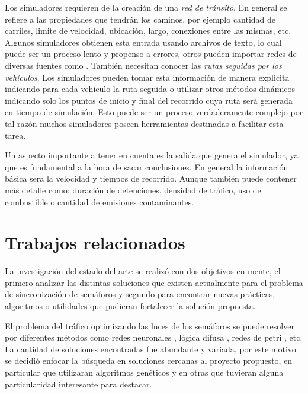 Los simuladores requieren de la creación de una \emph{red de tránsito}. En general se refiere a las propiedades que tendrán los caminos, por ejemplo cantidad de carriles, limite de velocidad, ubicación, largo, conexiones entre las mismas, etc. Algunos simuladores obtienen esta entrada usando archivos de texto, lo cual puede ser un proceso lento y propenso a errores, otros pueden importar redes de diversas fuentes como \citet{OSM}. También necesitan conocer las\emph{ rutas seguidas por los vehículos}. Los simuladores pueden tomar esta información de manera explicita indicando para cada vehículo la ruta seguida o utilizar otros métodos dinámicos indicando solo los puntos de inicio y final del recorrido cuya ruta será generada en tiempo de simulación. Esto puede ser un proceso verdaderamente complejo por tal razón muchos simuladores poseen herramientas destinadas a facilitar esta tarea.

Un aspecto importante a tener en cuenta es la salida que genera el simulador, ya que es fundamental a la hora de sacar conclusiones. En general la información básica sera la velocidad y tiempos de recorrido. Aunque también puede contener más detalle como: duración de detenciones, densidad de tráfico, uso de combustible o cantidad de emisiones contaminantes.  
 
\section{Trabajos relacionados}

La investigación del estado del arte se realizó con dos objetivos en mente, el primero analizar las distintas soluciones que existen actualmente para el problema de sincronización de semáforos y segundo para encontrar nuevas prácticas, algoritmos o utilidades que pudieran fortalecer la solución propuesta.

El problema del tráfico optimizando las luces de los semáforos se puede resolver por diferentes métodos como  redes neuronales \citep{Lopez1999}, lógica difusa \citep{Lim2001}, redes de petri \citep{DiFebbraro2002}, etc. La cantidad de soluciones encontradas fue abundante y variada, por este motivo se decidió enfocar la búsqueda en soluciones cercanas al proyecto propuesto, en particular que utilizaran algoritmos genéticos y en otras que tuvieran alguna particularidad interesante para destacar.


